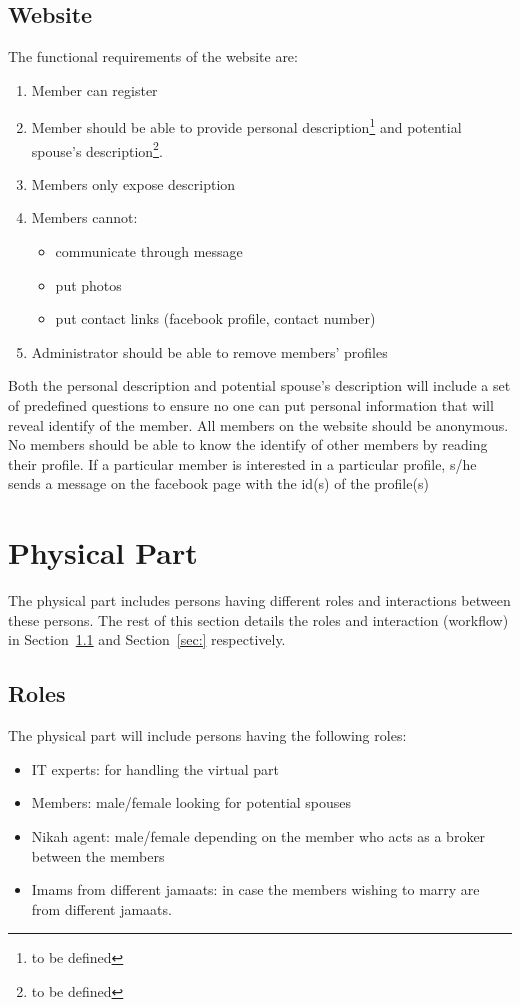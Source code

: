 \documentclass[12pt]{article}
\newcommand{\secref}[1]{Section~\ref{sec:#1}}
\begin{document}
\subsection{Website}
The functional requirements of the website are:
\begin{enumerate}
	\item Member can register
	\item Member should be able to provide personal description\footnote{to be defined} and potential spouse's description\footnote{to be defined}.
	\item Members only expose description
	\item Members cannot:
	\begin{itemize}
		\item communicate through message
		\item put photos
		\item put contact links (facebook profile, contact number)
	\end{itemize}
	\item Administrator should be able to remove members' profiles
\end{enumerate}

Both the personal description and potential spouse's description will include a set of predefined questions to ensure no one can put personal information that will reveal identify of the member. All members on the website should be anonymous. No members should be able to know the identify of other members by reading their profile. If a particular member is interested in a particular profile, s/he sends a message on the facebook page with the id(s) of the profile(s) 

\section{Physical Part}\label{sec:physicalPart}
The physical part includes persons having different roles and interactions between these persons. The rest of this section details the roles and interaction (workflow) in \secref{roles} and \secref{} respectively.

\subsection{Roles}\label{sec:roles}
The physical part will include persons having the following roles:
\begin{itemize}
	\item IT experts: for handling the virtual part
	\item Members: male/female looking for potential spouses
	\item Nikah agent: male/female depending on the member who acts as a broker between the members 
	\item Imams from different jamaats: in case the members wishing to marry are from different jamaats.
\end{itemize}
\end{document}
